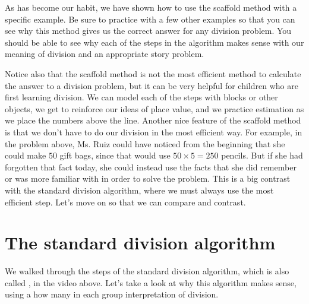 \documentclass{ximera}
\begin{document}
As has become our habit, we have shown how to use the scaffold method with a specific example. Be sure to practice with a few other examples so that you can see why this method gives us the correct answer for any division problem. You should be able to see why each of the steps in the algorithm makes sense with our meaning of division and an appropriate story problem.

Notice also that the scaffold method is not the most efficient method to calculate the answer to a division problem, but it can be very helpful for children who are first learning division. We can model each of the steps with blocks or other objects, we get to reinforce our ideas of place value, and we practice estimation as we place the numbers above the line. Another nice feature of the scaffold method is that we don't have to do our division in the most efficient way. For example, in the problem above, Ms. Ruiz could have noticed from the beginning that she could make $50$ gift bags, since that would use $50 \times 5 = 250$ pencils. But if she had forgotten that fact today, she could instead use the facts that she did remember or was more familiar with in order to solve the problem. This is a big contrast with the standard division algorithm, where we must always use the most efficient step. Let's move on so that we can compare and contrast.





\section{The standard division algorithm}

We walked through the steps of the standard division algorithm, which is also called , in the video above. Let's take a look at why this algorithm makes sense, using a how many in each group interpretation of division.
\end{document}
